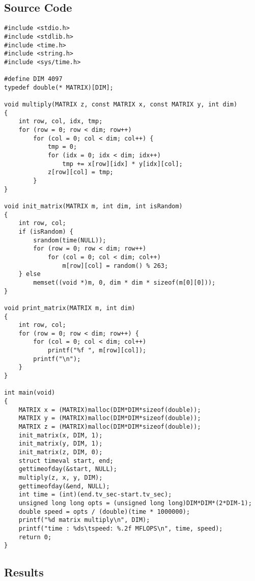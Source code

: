 \documentclass[a4paper, 11pt]{article}
\begin{document}
\subsection{Source Code}
\begin{verbatim}
#include <stdio.h>
#include <stdlib.h>
#include <time.h>
#include <string.h>
#include <sys/time.h>

#define DIM 4097
typedef double(* MATRIX)[DIM];

void multiply(MATRIX z, const MATRIX x, const MATRIX y, int dim)
{
    int row, col, idx, tmp;
    for (row = 0; row < dim; row++)
        for (col = 0; col < dim; col++) {
            tmp = 0;
            for (idx = 0; idx < dim; idx++)
                tmp += x[row][idx] * y[idx][col];
            z[row][col] = tmp;
        }
}

void init_matrix(MATRIX m, int dim, int isRandom)
{
    int row, col;
    if (isRandom) {
        srandom(time(NULL));
        for (row = 0; row < dim; row++)
            for (col = 0; col < dim; col++)
                m[row][col] = random() % 263;
    } else
        memset((void *)m, 0, dim * dim * sizeof(m[0][0]));
}

void print_matrix(MATRIX m, int dim)
{
    int row, col;
    for (row = 0; row < dim; row++) {
        for (col = 0; col < dim; col++)
            printf("%f ", m[row][col]);
        printf("\n");
    }
}

int main(void)
{
    MATRIX x = (MATRIX)malloc(DIM*DIM*sizeof(double));
    MATRIX y = (MATRIX)malloc(DIM*DIM*sizeof(double));
    MATRIX z = (MATRIX)malloc(DIM*DIM*sizeof(double));
    init_matrix(x, DIM, 1);
    init_matrix(y, DIM, 1);
    init_matrix(z, DIM, 0);
    struct timeval start, end;
    gettimeofday(&start, NULL);
    multiply(z, x, y, DIM);
    gettimeofday(&end, NULL);
    int time = (int)(end.tv_sec-start.tv_sec);
    unsigned long long opts = (unsigned long long)DIM*DIM*(2*DIM-1);
    double speed = opts / (double)(time * 1000000);
    printf("%d matrix multiply\n", DIM);
    printf("time : %ds\tspeed: %.2f MFLOPS\n", time, speed);
    return 0;
}
\end{verbatim}

\subsection{Results}
\end{document}
